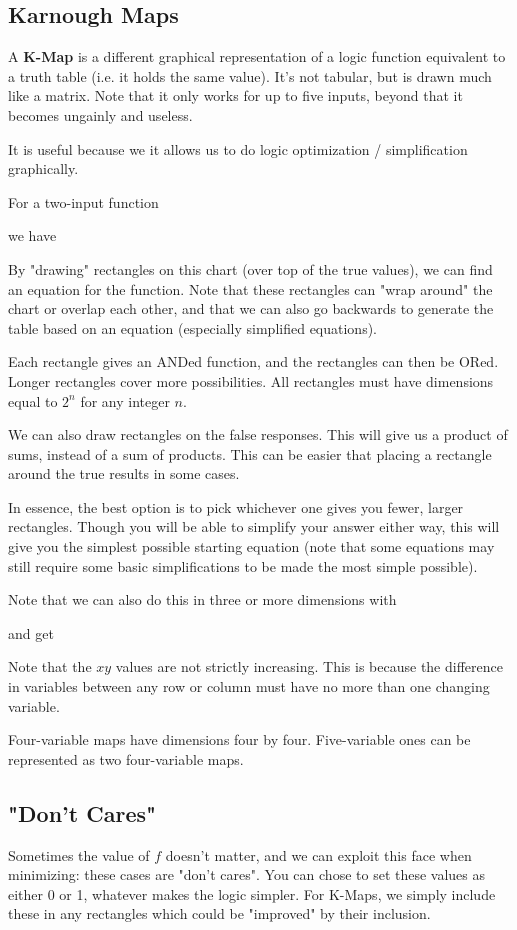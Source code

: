 \documentclass[12pt]{article}
\begin{document}
\subsection*{Karnough Maps}
A {\bf K-Map} is a different graphical representation of a logic function equivalent to a truth table (i.e. it holds the same value). It's not tabular, but is drawn much like a matrix. Note that it only works for up to five inputs, beyond that it becomes ungainly and useless.

It is useful because we it allows us to do logic optimization / simplification graphically. 

For a two-input function 

we have 

By "drawing" rectangles on this chart (over top of the true values), we can find an equation for the function. Note that these rectangles can "wrap around" the chart or overlap each other, and that we can also go backwards to generate the table based on an equation (especially simplified equations).

Each rectangle gives an ANDed function, and the rectangles can then be ORed. Longer rectangles cover more possibilities. All rectangles must have dimensions equal to $2^n$ for any integer $n$.

We can also draw rectangles on the false responses. This will give us a product of sums, instead of a sum of products. This can be easier that placing a rectangle around the true results in some cases.

In essence, the best option is to pick whichever one gives you fewer, larger rectangles. Though you will be able to simplify your answer either way, this will give you the simplest possible starting equation (note that some equations may still require some basic simplifications to be made the most simple possible).

Note that we can also do this in three or more dimensions with 

and get 

Note that the $xy$ values are not strictly increasing. This is because the difference in variables between any row or column must have no more than one changing variable.

Four-variable maps have dimensions four by four. Five-variable ones can be represented as two four-variable maps.

\subsection*{"Don't Cares"}
Sometimes the value of $f$ doesn't matter, and we can exploit this face when minimizing: these cases are "don't cares". You can chose to set these values as either 0 or 1, whatever makes the logic simpler. For K-Maps, we simply include these in any rectangles which could be "improved" by their inclusion.
\end{document}
